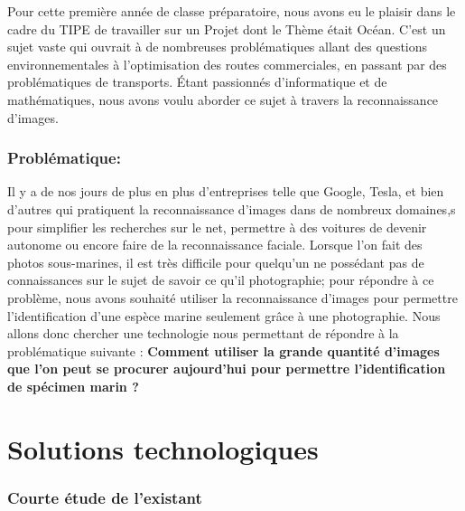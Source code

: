 \documentclass[12pt,a4paper]{extarticle}
\begin{document}
Pour cette première année de classe préparatoire, nous avons eu le plaisir dans le cadre du TIPE de travailler sur un Projet dont le Thème était Océan. C'est un sujet vaste qui ouvrait à de nombreuses problématiques allant des questions environnementales à l'optimisation des routes commerciales, en passant par des problématiques de transports. \'Etant passionnés d'informatique et de mathématiques, nous avons voulu aborder ce sujet à travers la reconnaissance d'images. 

\section*{Problématique:}

Il y a de nos jours de plus en plus d'entreprises telle que Google, Tesla, et bien d'autres qui pratiquent la reconnaissance d'images dans de nombreux domaines,s pour simplifier les recherches sur le net, permettre à des voitures de devenir autonome ou encore faire de la reconnaissance faciale. Lorsque l'on fait des photos sous-marines, il est très difficile pour quelqu'un ne possédant pas de connaissances sur le sujet de savoir ce qu'il photographie; pour répondre à ce problème, nous avons souhaité utiliser la reconnaissance d'images pour permettre l'identification d'une espèce marine seulement grâce à une photographie. Nous allons donc chercher une technologie nous permettant de répondre à la problématique suivante : \textbf{Comment utiliser la grande quantité d'images que l'on peut se procurer aujourd'hui pour permettre l'identification de spécimen marin ?}

\part{Solutions technologiques}

\section{Courte étude de l'existant}
\end{document}

